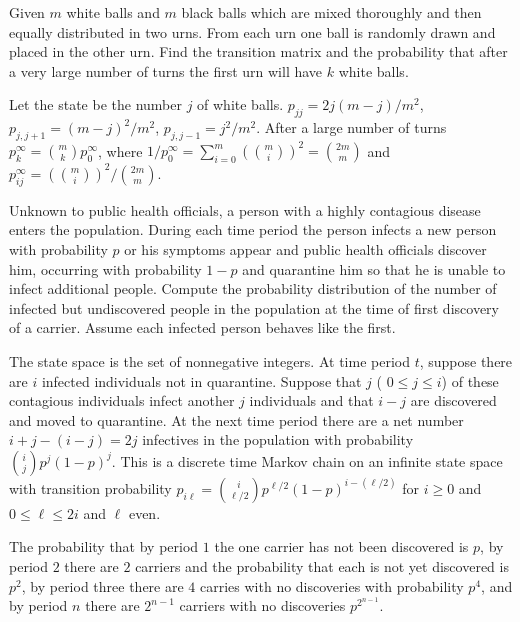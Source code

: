 \documentclass[12pt]{article}
\begin{document}
\begin{exercise}
    Given \( m \) white balls and \( m \) black balls which are mixed
    thoroughly and then equally distributed in two urns.  From each urn
    one ball is randomly drawn and placed in the other urn.  Find the
    transition matrix and the probability that after a very large number
    of turns the first urn will have \( k \) white balls.
\end{exercise}
\begin{solution}
    Let the state be the number \( j \) of white balls.  \( p_{jj} = 2j(m-j)/m^2
    \), \( p_{j,j+1} = (m-j)^2/m^2 \), \( p_{j,j-1} = j^2/m^2 \).  After
    a large number of turns \( p_k^{\infty} = \binom{m}{k} p_0^{\infty} \),
    where \( 1/p_0^{\infty} =\sum_{i=0}^m \left( \binom{m}{i} \right)^2
    = \binom{2m}{m} \) and \( p_{ij}^{\infty} = \left( \binom{m}{i}
    \right)^2/ \binom{2m}{m} \).
\end{solution}
\begin{exercise}
    Unknown to public health officials, a person with a highly
    contagious disease enters the population.  During each time period
    the person infects a new person with probability \( p \) or his
    symptoms appear and public health officials discover him, occurring
    with probability \( 1-p \) and quarantine him so that he is unable
    to infect additional people.  Compute the probability distribution
    of the number of infected but undiscovered people in the population
    at the time of first discovery of a carrier.  Assume each infected
    person behaves like the first.
\end{exercise}
\begin{solution}
    The state space is the set of nonnegative integers.  At time period \(
    t \), suppose there are \( i \) infected individuals not in
    quarantine.  Suppose that \( j \) ( \( 0 \le j \le i \)) of these
    contagious individuals infect another \( j \) individuals and that \(
    i-j \) are discovered and moved to quarantine.  At the next time
    period there are a net number \( i + j - (i-j) = 2j \) infectives in
    the population with probability \( \binom{i}{j}p^j(1-p)^j \).  This
    is a discrete time Markov chain on an infinite state space with
    transition probability \( p_{i\ell} = \binom{i}{\ell/2}p^{\ell/2}(1-p)^
    {i-(\ell/2)} \) for \( i \ge 0 \) and \( 0 \le \ell \le 2i \) and \(
    \ell \) even.

    The probability that by period \( 1 \) the one carrier has not been
    discovered is \( p \), by period \( 2 \) there are \( 2 \) carriers
    and the probability that each is not yet discovered is \( p^{2} \),
    by period three there are \( 4 \) carries with no discoveries with
    probability \( p^{4} \), and by period \( n \) there are \( 2^{n-1} \)
    carriers with no discoveries \( p^{2^{n-1}} \).
\end{solution}
\end{document}

